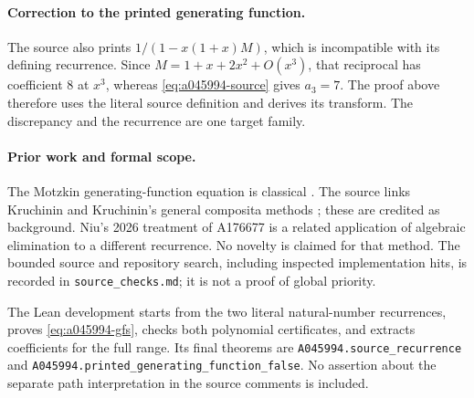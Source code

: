 \paragraph{Correction to the printed generating function.}
The source also prints $1/(1-x(1+x)M)$, which is incompatible with
its defining recurrence. Since $M=1+x+2x^2+O(x^3)$, that reciprocal
has coefficient $8$ at $x^3$, whereas \eqref{eq:a045994-source}
gives $a_3=7$. The proof above therefore uses the literal source
definition and derives its transform. The discrepancy and the
recurrence are one target family.

\paragraph{Prior work and formal scope.}
The Motzkin generating-function equation is classical
\cite{a045994-motzkin}. The source links Kruchinin and Kruchinin's
general composita methods \cite{a045994-kruchinin}; these are
credited as background. Niu's 2026 treatment of A176677
\cite{a045994-niu} is a related application of algebraic elimination
to a different recurrence. No novelty is claimed for that method.
The bounded source and repository search, including inspected
implementation hits, is recorded in \texttt{source\_checks.md};
it is not a proof of global priority.

The Lean development starts from the two literal natural-number
recurrences, proves \eqref{eq:a045994-gfs}, checks both polynomial
certificates, and extracts coefficients for the full range.
Its final theorems are
\texttt{A045994.source\_recurrence} and
\texttt{A045994.printed\_generating\_function\_false}.
No assertion about the separate path interpretation in the source
comments is included.
